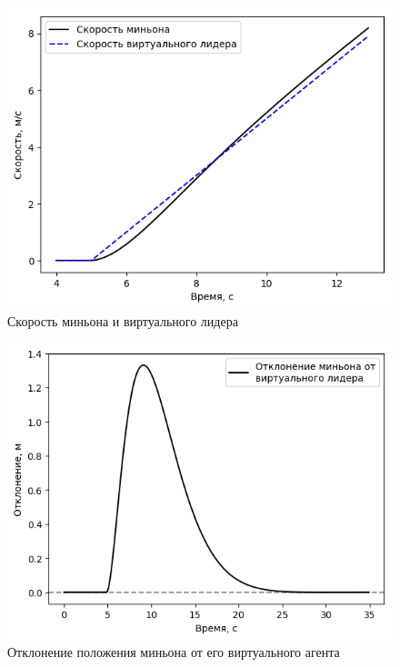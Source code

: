 \documentclass[12pt,a4paper]{article}
\begin{document}
\begin{figure}[!htbp]
	\centering
	\includegraphics[width=0.6\linewidth]{minion/heviside_velocity}
	\caption{Скорость миньона и виртуального лидера}
	\label{fig:hevisidevelocity}
\end{figure}
\begin{figure}
	\centering
	\includegraphics[width=0.6\linewidth]{minion/heviside_targerr}
	\caption{Отклонение положения миньона от его виртуального агента}
	\label{fig:hevisidetargerr}
\end{figure}
\end{document}
